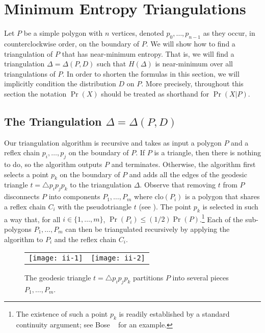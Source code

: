 \documentclass[lotsofwhite]{patmorin}
\newcommand{\closure}{\mathrm{clo}}
\begin{document}
\section{Minimum Entropy Triangulations} 

Let $P$ be a simple polygon with $n$ vertices, denoted
$p_0,\ldots,p_{n-1}$ as they occur, in counterclockwise order, on the
boundary of $P$.  We will show how to find a triangulation of $P$ that
has near-minimum entropy.  That is, we will find a triangulation
$\Delta=\Delta(P,D)$ such that $H(\Delta)$ is near-minimum over all
triangulations of $P$.  In order to shorten the formulas in this
section, we will implicitly condition the distribution $D$ on $P$.
More precisely, throughout this section the notation $\Pr(X)$ should
be treated as shorthand for $\Pr(X|P)$.

\subsection{The Triangulation $\Delta=\Delta(P,D)$}

Our triangulation algorithm is recursive and takes as input a polygon
$P$ and a reflex chain $p_i,\ldots,p_j$ on the boundary of $P$.  If
$P$ is a triangle, then there is nothing to do, so the algorithm
outputs $P$ and terminates. Otherwise, the
algorithm first selects a point $p_k$ on the boundary of $P$ and adds
all the edges of the geodesic triangle $t=\triangle p_ip_jp_k$ to the
triangulation $\Delta$.
Observe that removing $t$ from $P$ disconnects $P$ into
components $P_1,\ldots,P_m$ where $\closure(P_i)$ is a polygon that shares a
reflex chain $C_i$ with the pseudotriangle $t$ (see
).  The point
$p_k$ is selected in such a way that, for all $i\in\{1,\ldots,m\}$, $\Pr(P_i)
\le (1/2)\Pr(P)$.\footnote{The existence of such a point $p_k$ is
readily established by a standard continuity argument; see Bose \etal\
\cite{bdhlim07} for an example.} Each of the sub-polygons $P_1,\ldots,P_m$
can then be triangulated recursively by applying the algorithm to
$P_i$ and the reflex chain $C_i$.

\begin{figure}
  \begin{center}
    \begin{tabular}{cc}
      \texttt{[image: ii-1]} & \texttt{[image: ii-2]} 
    \end{tabular}
  \end{center}
  \caption{The geodesic triangle $t=\triangle p_i p_j p_k$ partitions $P$ into several
pieces $P_1,\ldots,P_m$.}
\end{figure}
\end{document}
